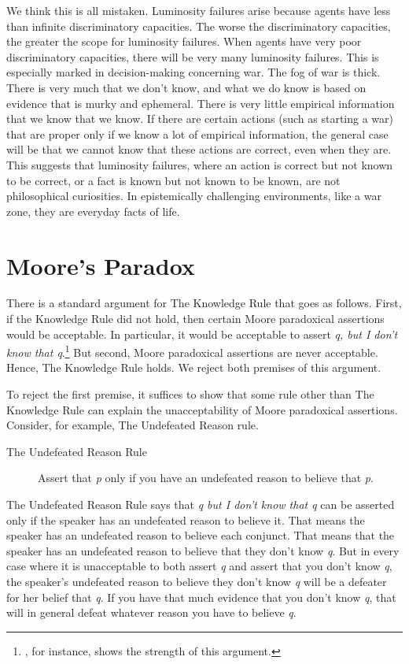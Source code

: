 We think this is all mistaken. Luminosity failures arise because agents have less than infinite discriminatory capacities. The worse the discriminatory capacities, the greater the scope for luminosity failures. When agents have very poor discriminatory capacities, there will be very many luminosity failures. This is especially marked in decision-making concerning war. The fog of war is thick. There is very much that we don't know, and what we do know is based on evidence that is murky and ephemeral. There is very little empirical information that we know that we know. If there are certain actions (such as starting a war) that are proper only if we know a lot of empirical information, the general case will be that we cannot know that these actions are correct, even when they are. This suggests that luminosity failures, where an action is correct but not known to be correct, or a fact is known but not known to be known, are not philosophical curiosities. In epistemically challenging environments, like a war zone, they are everyday facts of life.

\section{Moore's Paradox}

There is a standard argument for The Knowledge Rule that goes as follows. First, if the Knowledge Rule did not hold, then certain Moore paradoxical assertions would be acceptable. In particular, it would be acceptable to assert \textit{q, but I don't know that q}.\footnote{\cite[]{Williamson2000-WILKAI}, for instance, shows the strength of this argument.} But second, Moore paradoxical assertions are never acceptable. Hence, The Knowledge Rule holds. We reject both premises of this argument.

To reject the first premise, it suffices to show that some rule other than The Knowledge Rule can explain the unacceptability of Moore paradoxical assertions. Consider, for example, The Undefeated Reason rule.

\begin{description}
\item[The Undefeated Reason Rule] Assert that \textit{p} only if you have an undefeated reason to believe that \textit{p}.
\end{description}

\noindent The Undefeated Reason Rule says that \textit{q but I don't know that q} can be asserted only if the speaker has an undefeated reason to believe it. That means the speaker has an undefeated reason to believe each conjunct. That means that the speaker has an undefeated reason to believe that they don't know \textit{q}. But in every case where it is unacceptable to both assert \textit{q }and assert that you don't know\textit{ q}, the speaker's undefeated reason to believe they don't know \textit{q} will be a defeater for her belief that \textit{q}. If you have that much evidence that you don't know \textit{q}, that will in general defeat whatever reason you have to believe \textit{q}. 

